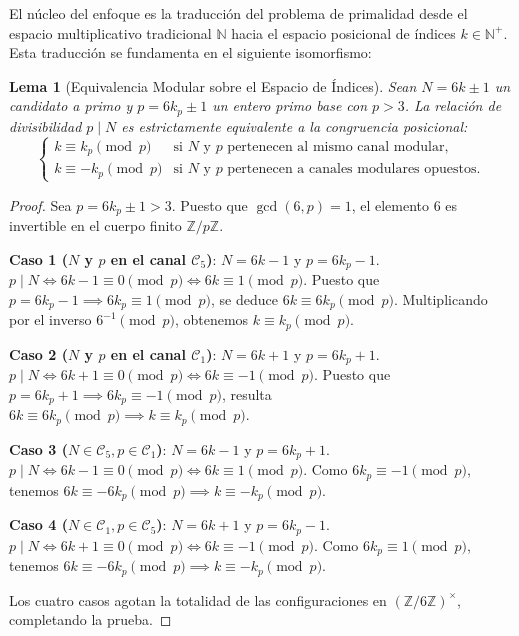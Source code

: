 \documentclass{article}
\numberwithin{equation}{section}
\theoremstyle{plain}
\newtheorem{lemma}[theorem]{Lema}
\theoremstyle{definition}
\begin{document}
El núcleo del enfoque es la traducción del problema de primalidad desde el espacio multiplicativo tradicional $\mathbb{N}$ hacia el espacio posicional de índices $k \in \mathbb{N}^+$. Esta traducción se fundamenta en el siguiente isomorfismo:

\begin{lemma}[Equivalencia Modular sobre el Espacio de Índices]
\label{lem:equiv-modular}
Sean $N = 6k \pm 1$ un candidato a primo y $p = 6k_p \pm 1$ un entero primo base con $p > 3$. La relación de divisibilidad $p \mid N$ es estrictamente equivalente a la congruencia posicional:
\begin{equation}
\begin{cases}
k \equiv k_p \pmod p & \text{si } N \text{ y } p \text{ pertenecen al mismo canal modular,} \\
k \equiv -k_p \pmod p & \text{si } N \text{ y } p \text{ pertenecen a canales modulares opuestos.}
\end{cases}
\end{equation}
\end{lemma}

\begin{proof}
Sea $p = 6k_p \pm 1 > 3$. Puesto que $\gcd(6, p) = 1$, el elemento $6$ es invertible en el cuerpo finito $\mathbb{Z}/p\mathbb{Z}$.

\textbf{Caso 1 ($N$ y $p$ en el canal $\mathcal{C}_5$)}: $N = 6k - 1$ y $p = 6k_p - 1$.
$p \mid N \iff 6k - 1 \equiv 0 \pmod p \iff 6k \equiv 1 \pmod p$.
Puesto que $p = 6k_p - 1 \implies 6k_p \equiv 1 \pmod p$, se deduce $6k \equiv 6k_p \pmod p$. Multiplicando por el inverso $6^{-1} \pmod p$, obtenemos $k \equiv k_p \pmod p$.

\textbf{Caso 2 ($N$ y $p$ en el canal $\mathcal{C}_1$)}: $N = 6k + 1$ y $p = 6k_p + 1$.
$p \mid N \iff 6k + 1 \equiv 0 \pmod p \iff 6k \equiv -1 \pmod p$.
Puesto que $p = 6k_p + 1 \implies 6k_p \equiv -1 \pmod p$, resulta $6k \equiv 6k_p \pmod p \implies k \equiv k_p \pmod p$.

\textbf{Caso 3 ($N \in \mathcal{C}_5, p \in \mathcal{C}_1$)}: $N = 6k - 1$ y $p = 6k_p + 1$.
$p \mid N \iff 6k - 1 \equiv 0 \pmod p \iff 6k \equiv 1 \pmod p$.
Como $6k_p \equiv -1 \pmod p$, tenemos $6k \equiv -6k_p \pmod p \implies k \equiv -k_p \pmod p$.

\textbf{Caso 4 ($N \in \mathcal{C}_1, p \in \mathcal{C}_5$)}: $N = 6k + 1$ y $p = 6k_p - 1$.
$p \mid N \iff 6k + 1 \equiv 0 \pmod p \iff 6k \equiv -1 \pmod p$.
Como $6k_p \equiv 1 \pmod p$, tenemos $6k \equiv -6k_p \pmod p \implies k \equiv -k_p \pmod p$.

Los cuatro casos agotan la totalidad de las configuraciones en $(\mathbb{Z}/6\mathbb{Z})^\times$, completando la prueba.
\end{proof}
\end{document}
